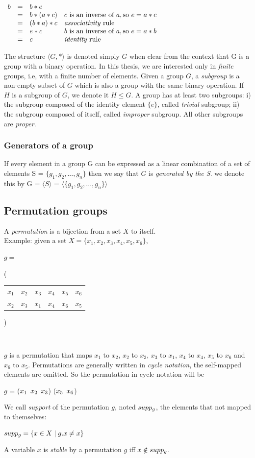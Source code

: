  $\begin{array}{lcll}     
b & = & b * e & \\
& = & b * (a * c) & c \text{ is an inverse of } a, \text{so } e = a * c\\
& = & (b * a) * c &   \text{\emph{associativity} rule}\\
& = & e * c       & b \text{ is an inverse of } a, \text{so } e = a * b\\
& = & c           &   \text{\emph{identity} rule}
\end{array}$

The structure $\langle G, * \rangle$ is denoted simply $G$ when clear from the context that G is a group
with a binary operation. In this thesis, we are interested only in \emph{finite} groups, i.e,
with a finite number of elements.
Given a group $G$, a \emph{subgroup} is a non-empty subset of $G$ which is also a group with 
the same binary operation. If $H$ is a subgroup of $G$, we denote it $H \leq G$.
A group has at least two subgroups: i) the subgroup composed of the identity element $\{e\}$, called \emph{trivial} subgroup; ii) the subgroup composed of itself, called \emph{improper} subgroup. All other subgroups are \emph{proper}.

\subsubsection{Generators of a group}
If every element in a group G can be expressed as a linear combination
of a set of elements S = $\{g_1, g_2, ..., g_n \}$ then we say that $G$ is 
\textit{generated by the S}. we denote this by G = $\langle S \rangle$ =
$\langle \{g_1, g_2, ..., g_n \} \rangle$ 

\subsection{Permutation groups}
A \emph{permutation} is a bijection from a set $X$ to itself.\\
Example: given a set $X = \{x_1, x_2, x_3, x_4, x_5, x_6\}$,
\begin{center}
$g = ${\Bigg( \begin{tabular}{cccccc}
  $x_1$ & $x_2$ & $x_3$ & $x_4$ & $x_5$ & $x_6$\\
  $x_2$ & $x_3$ & $x_1$ & $x_4$ & $x_6$ & $x_5$
 \end{tabular} \Bigg)}\\
\end{center}
$g$ is a permutation that maps $x_1$ to $x_2$, $x_2$ to $x_3$, $x_3$ to $x_1$, $x_4$ to $x_4$, $x_5$ to $x_6$ and $x_6$ to $x_5$.
Permutations are generally written in \emph{cycle notation}, the self-mapped elements are omitted.
So the permutation in cycle notation will be 
\begin{center}
 $g$ = ($x_1 \enskip x_2 \enskip x_3$) ($x_5 \enskip x_6$)
\end{center}
We call \emph{support} of the permutation $g$, noted $supp_{g}$, the elements that not mapped to themselves:
\begin{center}
 $supp_{g} = \{ x \in X \mid g.x \neq x\}$
\end{center}
A variable $x$ is \emph{stable} by a permutation $g$ 
iff $x \notin supp_g$.

